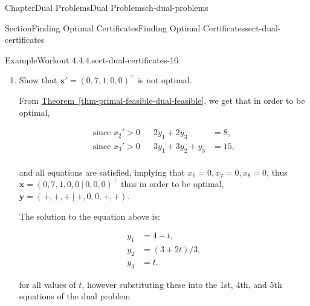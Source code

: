 \documentclass[oneside,10pt,]{book}
\newcommand{\xreffont}{\relax}
\numberwithin{equation}{section}
\newcommand{\amp}{&}
\begin{document}
\begin{chapterptx}{Chapter}{Dual Problems}{}{Dual Problems}{}{}{ch-dual-problems}
\begin{sectionptx}{Section}{Finding Optimal Certificates}{}{Finding Optimal Certificates}{}{}{sect-dual-certificates}
\begin{example}{Example}{Workout 4.4.4.}{sect-dual-certificates-16}
\begin{enumerate}
\begin{equation*}
\end{equation*}
%
\par
and since when \(\boldsymbol{x}'=(2,0,1,3,0)^{\intercal}\)%
\par
%
\begin{equation*}
\begin{aligned}x'_{1} + 2x'_{2} + 3x'_{3} + 4x'_{4} + 5x'_{5} \amp = 17, \\ -x'_{1} + 3x'_{3} - x'_{5} \amp = 1 < 3, \\ 3x'_{1} + 2x'_{2} + x'_{3} - x'_{4} \amp = 4< 15, \\\end{aligned}
\end{equation*}
%
\par
this implies that \(y_{2}=0\) and \(y_{3}=0\). and thus \(y_{1}=5\) and \(\boldsymbol{y}=(5,0,0)^{\intercal}\) satisfies all the constraints of the dual, so \(\boldsymbol{x}=(2,0,1,3,0)^{\intercal}\) is optimal.%
\item{}Show that \(\boldsymbol{x}'=(0,7,1,0,0)^{\intercal}\) is not optimal.%
\par
From \hyperref[thm-primal-feasible-dual-feasible]{Theorem~{\xreffont\ref{thm-primal-feasible-dual-feasible}}}, we get that in order to be optimal,%
\par
%
\begin{equation*}
\begin{aligned}\text{since $x_{2}' > 0$} \amp  \amp 2y_{1}+2y_{3} \amp = 8, \\ \text{since $x_{3}' > 0$} \amp  \amp 3y_{1}+3y_{2}+y_{3} \amp = 15, \\\end{aligned}
\end{equation*}
%
\par
and all equations are satisfied, implying that \(x_{6} =0, x_{7}=0, x_{8}=0\), thus \(\boldsymbol{x}=(0,7,1,0,0~|~0,0,0)^{\intercal}\) thus in order to be optimal, \(\boldsymbol{y}=(+,+,+~|~+,0,0,+,+)\).%
\par
The solution to the equation above is:%
\par
%
\begin{equation*}
\begin{aligned}y_{1} \amp = 4-t, \\ y_{2} \amp =(3+2t)/3, \\ y_{3} \amp = t.\end{aligned}
\end{equation*}
%
\par
for all values of \(t\), however substituting these into the 1st, 4th, and 5th equations of the dual problem%

\end{enumerate}
\end{example}
\end{sectionptx}
\end{chapterptx}
\end{document}

